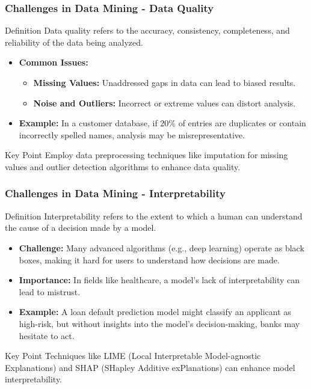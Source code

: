 \documentclass{beamer}
\begin{document}
\begin{frame}[fragile]
    \frametitle{Challenges in Data Mining - Data Quality}
    \begin{block}{Definition}
        Data quality refers to the accuracy, consistency, completeness, and reliability of the data being analyzed.
    \end{block}
    \begin{itemize}
        \item \textbf{Common Issues:}
        \begin{itemize}
            \item \textbf{Missing Values:} Unaddressed gaps in data can lead to biased results.
            \item \textbf{Noise and Outliers:} Incorrect or extreme values can distort analysis.
        \end{itemize}
        \item \textbf{Example:} In a customer database, if 20\% of entries are duplicates or contain incorrectly spelled names, analysis may be misrepresentative.
    \end{itemize}
    \begin{block}{Key Point}
        Employ data preprocessing techniques like imputation for missing values and outlier detection algorithms to enhance data quality.
    \end{block}
\end{frame}

\begin{frame}[fragile]
    \frametitle{Challenges in Data Mining - Interpretability}
    \begin{block}{Definition}
        Interpretability refers to the extent to which a human can understand the cause of a decision made by a model.
    \end{block}
    \begin{itemize}
        \item \textbf{Challenge:} Many advanced algorithms (e.g., deep learning) operate as black boxes, making it hard for users to understand how decisions are made.
        \item \textbf{Importance:} In fields like healthcare, a model’s lack of interpretability can lead to mistrust.
        \item \textbf{Example:} A loan default prediction model might classify an applicant as high-risk, but without insights into the model’s decision-making, banks may hesitate to act.
    \end{itemize}
    \begin{block}{Key Point}
        Techniques like LIME (Local Interpretable Model-agnostic Explanations) and SHAP (SHapley Additive exPlanations) can enhance model interpretability.
    \end{block}
\end{frame}
\end{document}
